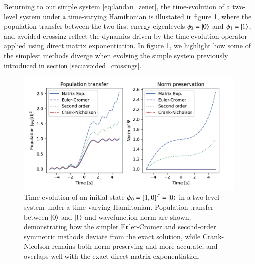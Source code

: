 \documentclass{subfiles}
\begin{document}
Returning to our simple system \eqref{eq:landau_zener}, the time-evolution of a two-level system under a time-varying Hamiltonian is illustated in figure \ref{fig:landau_zener}, where the population transfer between the two first energy eigenlevels $\phi_0 = \ket{0}$ and $\phi_1=\ket{1}$, and avoided crossing reflect the dynamics driven by the time-evolution operator applied using direct matrix exponentiation. In figure \ref{fig:landau_zener}, we highlight how some of the simplest methods diverge when evolving the simple system previously introduced in section \ref{sec:avoided_crossings}.
\begin{figure}[h!]
    \centering
    \includegraphics[width=1.0\textwidth]{figs/landau_zener_numerical_methods.pdf}
    \caption{Time evolution of an initial state $\psi_0 = [1,0]^T = \ket{0}$ in a two-level system under a time-varying Hamiltonian. Population transfer between $\ket{0}$ and $\ket{1}$ and wavefunction norm are shown, demonstrating how the simpler Euler-Cromer and second-order symmetric methods deviate from the exact solution, while Crank-Nicolson remains both norm-preserving and more accurate, and overlaps well with the exact direct matrix exponentiation.}\label{fig:landau_zener}
\end{figure}
\end{document}
